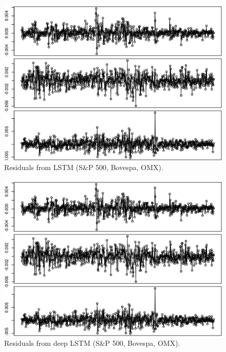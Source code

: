 \documentclass[12pt, letterpaper]{amsart}%
\begin{document}
\begin{figure}[H]
\caption{Residuals from LSTM (S\&P 500, Bovespa, OMX).}
\centering
\includegraphics[scale=0.4]{lstm_resid.png}
\end{figure}

\begin{figure}[H]
\caption{Residuals from deep LSTM (S\&P 500, Bovespa, OMX).}
\centering
\includegraphics[scale=0.4]{lstm_deep_resid.png}
\end{figure}

\end{document}
